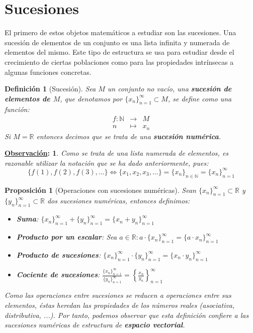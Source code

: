 \documentclass[10pt,a4paper,openright]{book}
\theoremstyle{break}
\newtheorem*{defi}{Definición}
\newtheorem*{prop}{Proposición}
\newtheorem*{obs}{\underline{Observación}:}
\begin{document}
\section{Sucesiones}
El primero de estos objetos matemáticos a estudiar son las sucesiones. Una sucesión de elementos de un conjunto es una lista infinita y numerada de elementos del mismo. Este tipo de estructura se usa para estudiar desde el crecimiento de ciertas poblaciones como para las propiedades intrínsecas a algunas funciones concretas.

\begin{defi}[Sucesión]
Sea $M$ un conjunto no vacío, una \textbf{sucesión de elementos de $M$}, que denotamos por $\{x_n\}_{n=1}^\infty\subset M$, se define como una función:
\begin{eqnarray*}
f: \mathbb N &\rightarrow& M \\
n &\longmapsto& x_n
\end{eqnarray*}
Si $M=\mathbb R$ entonces decimos que se trata de una \textbf{sucesión numérica}. 
\end{defi}

\begin{obs}
Como se trata de una lista numerada de elementos, es razonable utilizar la notación que se ha dado anteriormente, pues:
$$\{f(1),f(2),f(3), ...\}\Leftrightarrow \{x_1,x_2,x_3,...\}=\{x_n\}_{n\in \mathbb N}=\{x_n\}_{n=1}^{\infty}$$
\end{obs}

\begin{prop}[Operaciones con sucesiones numéricas]
Sean $\{x_n\}_{n=1}^{\infty}\subset \mathbb R$ y $\{y_n\}_{n=1}^{\infty}\subset \mathbb R$ dos sucesiones numéricas, entonces definimos:
\begin{itemize}
\item \textbf{Suma}: $\{x_n\}_{n=1}^{\infty}+\{y_n\}_{n=1}^{\infty}=\{x_n+y_n\}_{n=1}^{\infty}$

\item \textbf{Producto por un escalar}: Sea $a\in \mathbb R: a\cdot \{x_n\}_{n=1}^{\infty}=\{a\cdot x_n\}_{n=1}^{\infty}$

\item \textbf{Producto de sucesiones}: $\{x_n\}_{n=1}^{\infty}\cdot \{y_n\}_{n=1}^{\infty}=\{x_n\cdot y_n\}_{n=1}^{\infty}$

\item \textbf{Cociente de sucesiones}: $\frac{\{x_n\}_{n=1}^{\infty}}{\{y_n\}_{n=1}^{\infty}}=\left\lbrace\frac{x_n}{y_n}\right\rbrace_{n=1}^{\infty}$
\end{itemize}

Como las operaciones entre sucesiones se reducen a operaciones entre sus elementos, éstas heredan las propiedades de los números reales (asociativa, distributiva, ...). Por tanto, podemos observar que esta definición confiere a las sucesiones numéricas de estructura de \textbf{espacio vectorial}.
\end{prop}
\end{document}

